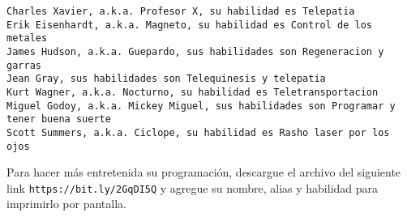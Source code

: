 \begin{lstlisting}[style=consola]
Charles Xavier, a.k.a. Profesor X, su habilidad es Telepatia
Erik Eisenhardt, a.k.a. Magneto, su habilidad es Control de los metales
James Hudson, a.k.a. Guepardo, sus habilidades son Regeneracion y garras
Jean Gray, sus habilidades son Telequinesis y telepatia
Kurt Wagner, a.k.a. Nocturno, su habilidad es Teletransportacion
Miguel Godoy, a.k.a. Mickey Miguel, sus habilidades son Programar y tener buena suerte
Scott Summers, a.k.a. Ciclope, su habilidad es Rasho laser por los ojos
\end{lstlisting}

Para hacer más entretenida su programación, descargue el archivo del siguiente link \texttt{https://bit.ly/2GqDI5Q} y agregue su nombre, alias y habilidad para imprimirlo por pantalla.